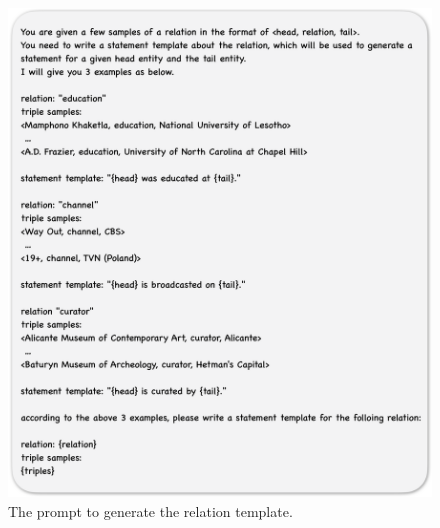 
\begin{figure}[t]
    \centering
    \includegraphics[width=4.5in]{submissions/Jing2024/figures/relation_template_prompt.pdf}
    \vspace{-3mm}
    \caption{The prompt to generate the relation template.}
    \label{fig:relation_template_prompt}
\end{figure}
